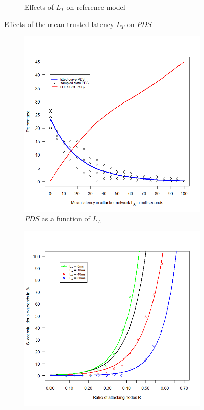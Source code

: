 \documentclass[a4paper,12pt,twoside]{report}
\begin{document}
\begin{figure}
\begin{subfigure}{.5\textwidth}
  \caption{Effects of $L_{T}$ on reference model}
  \label{trulat:b}
\end{subfigure}
\caption{Effects of the mean trusted latency $L_{T}$ on $PDS$}
\label{trulat}
\end{figure}
\begin{figure}
\centering
\begin{subfigure}{.5\textwidth}
  \centering
  \includegraphics[width=\linewidth]{Experiments/AttLatency/attlat.png}
  \caption{$PDS$ as a function of $L_{A}$}
  \label{attlat:a}
\end{subfigure}%
\begin{subfigure}{.5\textwidth}
  \centering
  \includegraphics[width=\linewidth]{Experiments/AttLatency/attrat.png}

\end{subfigure}
\end{figure}
\end{document}
